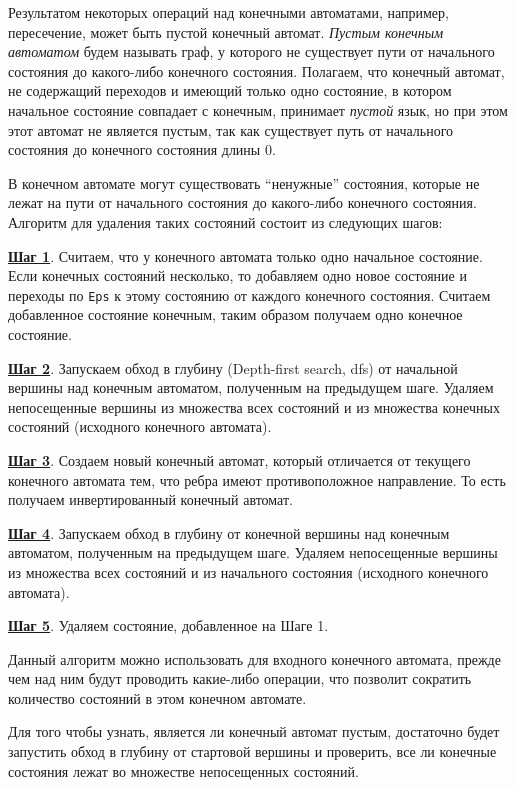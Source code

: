 Результатом некоторых операций над конечными автоматами, например, пересечение, может быть пустой конечный автомат. \textit{Пустым конечным автоматом} будем называть граф, у которого не существует пути от начального состояния до какого-либо конечного состояния. Полагаем, что конечный автомат, не содержащий переходов и имеющий только одно состояние, в котором начальное состояние совпадает с конечным, принимает \textit{пустой} язык, но при этом этот автомат не является пустым, так как существует путь от начального состояния до конечного состояния длины 0. 

В конечном автомате могут существовать ``ненужные'' состояния, которые не лежат на пути от начального состояния до какого-либо конечного состояния. Алгоритм для удаления таких состояний состоит из следующих шагов:

\textbf{\underline{Шаг 1}}. Считаем, что у конечного автомата только одно начальное состояние. Если конечных состояний несколько, то добавляем одно новое состояние и переходы по \verb|Eps| к этому состоянию от каждого конечного состояния. Считаем добавленное состояние конечным, таким образом получаем одно конечное состояние.

\textbf{\underline{Шаг 2}}. Запускаем обход в глубину (Depth-first search, dfs) от начальной вершины над конечным автоматом, полученным на предыдущем шаге. Удаляем непосещенные вершины из множества всех состояний и из множества конечных состояний (исходного конечного автомата).

\textbf{\underline{Шаг 3}}. Создаем новый конечный автомат, который отличается от текущего конечного автомата тем, что ребра имеют противоположное направление. То есть получаем инвертированный конечный автомат.

\textbf{\underline{Шаг 4}}. Запускаем обход в глубину от конечной вершины над конечным автоматом, полученным на предыдущем шаге. Удаляем непосещенные вершины из множества всех состояний и из начального состояния (исходного конечного автомата). 

\textbf{\underline{Шаг 5}}. Удаляем состояние, добавленное на Шаге 1. 

Данный алгоритм можно использовать для входного конечного автомата, прежде чем над ним будут проводить какие-либо операции, что позволит сократить количество состояний в этом конечном автомате.

Для того чтобы узнать, является ли конечный автомат пустым, достаточно будет запустить обход в глубину от стартовой вершины и проверить, все ли конечные состояния лежат во множестве непосещенных состояний.

